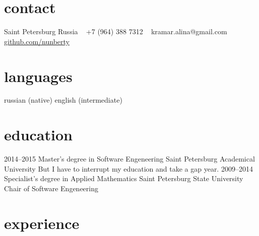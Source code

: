 \documentclass[]{friggeri-cv} %
\begin{document}


\begin{aside} %
\section{contact}
Saint Petersburg
Russia
~
+7 (964) 388 7312
~
kramar.alina@gmail.com
\href{https://github.com/nunberty}{github.com/nunberty}
\section{languages}
russian (native)
english (intermediate)
\end{aside}

\section{education}

\begin{entrylist}
\entry
{2014--2015}
{Master's degree {\normalfont in Software Engeneering}}
{Saint Petersburg Academical University}
{But I have to interrupt my education and take a gap year.}
{}
\entry
{2009--2014}
{Specialist's degree {\normalfont in Applied Mathematics}}
{Saint Petersburg State University}
{Chair of Software Engeneering}
\end{entrylist}

\section{experience}
\end{document}
